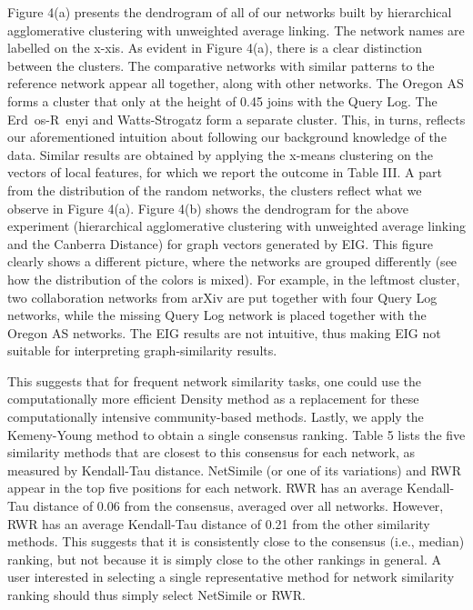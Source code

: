 Figure 4(a) presents the dendrogram of all of our networks built by hierarchical agglomerative clustering with unweighted
average linking. The network names are labelled on the x-xis. As evident in Figure 4(a), there is a
clear distinction between the clusters. The comparative networks with similar patterns to the reference network appear all together, along with other networks. The Oregon AS forms a cluster that only at the height of 0.45 joins with the Query Log. The Erd os-R enyi and Watts-Strogatz form a separate cluster. This, in turns, reflects our aforementioned intuition about following our background knowledge of the data. Similar results are obtained by applying the x-means clustering on the vectors of local features, for which we report the outcome in Table III. A part from the
distribution of the random networks, the clusters reflect what we observe in Figure 4(a).
Figure 4(b) shows the dendrogram for the above experiment (hierarchical agglomerative clustering with unweighted
average linking and the Canberra Distance) for graph vectors
generated by EIG. This figure clearly shows a different
picture, where the networks are grouped differently (see how
the distribution of the colors is mixed). For example, in the
leftmost cluster, two collaboration networks from arXiv are
put together with four Query Log networks, while the missing
Query Log network is placed together with the Oregon AS
networks. The EIG results are not intuitive, thus making EIG
not suitable for interpreting graph-similarity results.


This suggests that for frequent network similarity tasks,
one could use the computationally more efficient Density
method as a replacement for these computationally
intensive community-based methods.
Lastly, we apply the Kemeny-Young method to obtain
a single consensus ranking. Table 5 lists the five
similarity methods that are closest to this consensus for
each network, as measured by Kendall-Tau distance.
NetSimile (or one of its variations) and RWR appear
in the top five positions for each network. RWR has
an average Kendall-Tau distance of 0.06 from the consensus,
averaged over all networks. However, RWR has
an average Kendall-Tau distance of 0.21 from the other
similarity methods. This suggests that it is consistently
close to the consensus (i.e., median) ranking, but not
because it is simply close to the other rankings in general.
A user interested in selecting a single representative
method for network similarity ranking should thus
simply select NetSimile or RWR.



